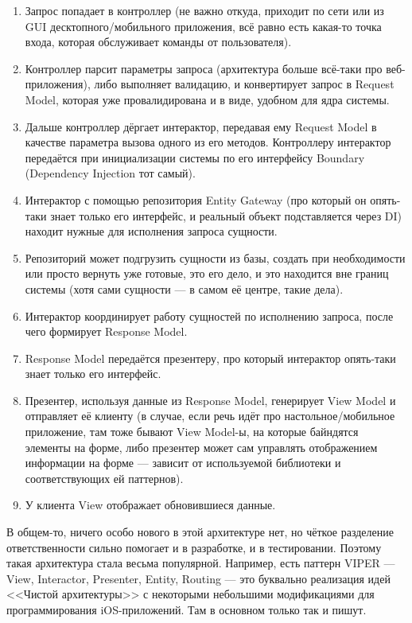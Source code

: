 \documentclass[a5paper]{article}
\begin{document}
\begin{enumerate}
    \item Запрос попадает в контроллер (не важно откуда, приходит по сети или из GUI десктопного/мобильного приложения, всё равно есть какая-то точка входа, которая обслуживает команды от пользователя).
    \item Контроллер парсит параметры запроса (архитектура больше всё-таки про веб-приложения), либо выполняет валидацию, и конвертирует запрос в Request Model, которая уже провалидирована и в виде, удобном для ядра системы.
    \item Дальше контроллер дёргает интерактор, передавая ему Request Model в качестве параметра вызова одного из его методов. Контроллеру интерактор передаётся при инициализации системы по его интерфейсу Boundary (Dependency Injection тот самый).
    \item Интерактор с помощью репозитория Entity Gateway (про который он опять-таки знает только его интерфейс, и реальный объект подставляется через DI) находит нужные для исполнения запроса сущности.
    \item Репозиторий может подгрузить сущности из базы, создать при необходимости или просто вернуть уже готовые, это его дело, и это находится вне границ системы (хотя сами сущности --- в самом её центре, такие дела).
    \item Интерактор координирует работу сущностей по исполнению запроса, после чего формирует Response Model.
    \item Response Model передаётся презентеру, про который интерактор опять-таки знает только его интерфейс.
    \item Презентер, используя данные из Response Model, генерирует View Model и отправляет её клиенту (в случае, если речь идёт про настольное/мобильное приложение, там тоже бывают View Model-ы, на которые байндятся элементы на форме, либо презентер может сам управлять отображением информации на форме --- зависит от используемой библиотеки и соответствующих ей паттернов).
    \item У клиента View отображает обновившиеся данные.
\end{enumerate}

В общем-то, ничего особо нового в этой архитектуре нет, но чёткое разделение ответственности сильно помогает и в разработке, и в тестировании. Поэтому такая архитектура стала весьма популярной. Например, есть паттерн VIPER --- View, Interactor, Presenter, Entity, Routing --- это буквально реализация идей <<Чистой архитектуры>> с некоторыми небольшими модификациями для программирования iOS-приложений. Там в основном только так и пишут.
\end{document}
